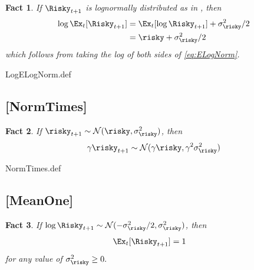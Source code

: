 \documentclass{handout}
\newtheorem{Fact}{Fact}
\begin{document}
\begin{Fact} If $\Risky_{t+1}$ is lognormally distributed as in {\ELogNorm}, then
\begin{equation}\begin{gathered}\begin{aligned}
        \log \Ex_{t}[\Risky_{t+1}] & =  \Ex_{t}[\log \Risky_{t+1}]+\sigma_{\risky}^{2}/2
\\ & =  \risky +\sigma_{\risky}^{2}/2
\end{aligned}\end{gathered}\end{equation}
which follows from taking the log of both sides of \eqref{eq:ELogNorm}.
\end{Fact}

\begin{verbatimwrite}{LogELogNorm.def}
\providecommand{\LogELogNorm}{\href{http://www.econ2.jhu.edu/people/ccarroll/public/LectureNotes/MathFacts/MathFactsList\#LogELogNorm}{\ensuremath{\mathtt{[LogELogNorm]}}}}
\end{verbatimwrite}

\hypertarget{NormTimes}{}
\subsection{[NormTimes]}\label{NormTimes}

\begin{Fact} If $\risky_{t+1} \sim \mathcal{N}(\null{\risky},\sigma_{\risky}^{2})$, then
\begin{equation}
        \gamma \risky_{t+1} \sim \mathcal{N}(\gamma \risky,\gamma^{2} \sigma_{\risky}^{2})
\end{equation}
\end{Fact}

\begin{verbatimwrite}{NormTimes.def}
\providecommand{\NormTimes}{\href{http://www.econ2.jhu.edu/people/ccarroll/public/LectureNotes/MathFacts/MathFactsList\#NormTimes}{\ensuremath{\mathtt{[NormTimes]}}}}
\end{verbatimwrite}

\hypertarget{MeanOne}{}
\subsection{[MeanOne]}

\begin{Fact} If $\log \Risky_{t+1} \sim \mathcal{N}(-\sigma_{\risky}^{2}/2,\sigma_{\risky}^{2})$, then
\begin{equation}\begin{gathered}\begin{aligned}
        \Ex_{t}[\Risky_{t+1}] & =  1
\end{aligned}\end{gathered}\end{equation}
for any value of $\sigma_{\risky}^{2} \geq 0.$
\end{Fact}
\end{document}
